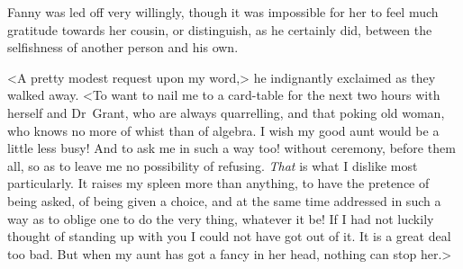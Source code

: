 Fanny was led off very willingly, though it was impossible for her to feel much gratitude towards her cousin, or distinguish, as he certainly did, between the selfishness of another person and his own.

<A pretty modest request upon my word,> he indignantly exclaimed as they walked away. <To want to nail me to a card-table for the next two hours with herself and Dr~Grant, who are always quarrelling, and that poking old woman, who knows no more of whist than of algebra. I wish my good aunt would be a little less busy! And to ask me in such a way too! without ceremony, before them all, so as to leave me no possibility of refusing. \textit{That}  is what I dislike most particularly. It raises my spleen more than anything, to have the pretence of being asked, of being given a choice, and at the same time addressed in such a way as to oblige one to do the very thing, whatever it be! If I had not luckily thought of standing up with you I could not have got out of it. It is a great deal too bad. But when my aunt has got a fancy in her head, nothing can stop her.> 